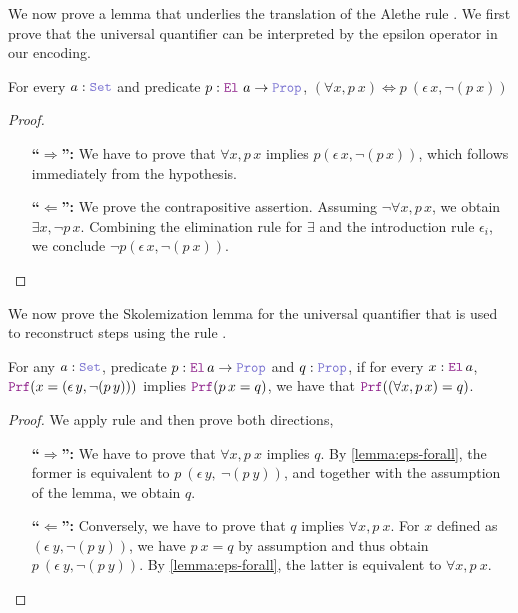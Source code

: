 We now prove a lemma that underlies the translation of the Alethe rule .
We first prove that the universal quantifier can be interpreted by the epsilon operator in our encoding.

\smallskip

\begin{lemma}\label{lemma:eps-forall}
For every $a : \set$ and predicate $p: \el~a \ra \prop$, $(\forall x, p~x) \Leftrightarrow p~(\epsilon\,x, \neg (p~x))$
\end{lemma}
\begin{proof}
\begin{itemize}
\item[\textbf{``$\Rightarrow$'':}]  We have to prove that $\forall x, p\,x$ implies $p(\epsilon\,x, \neg (p\,x))$, which follows immediately from the hypothesis.
\item[\textbf{``$\Leftarrow$'':}]  We prove the contrapositive assertion. Assuming $\neg \forall x, p\,x$, we obtain $\exists x, \neg p\,x$. Combining the elimination rule for $\exists$ and the introduction rule $\epsilon_i$, we conclude $\neg p(\epsilon\,x, \neg (p~x))$.
\end{itemize}
\end{proof}

We now prove the Skolemization lemma for the universal quantifier that is used to reconstruct steps using the rule .

\smallskip

\begin{lemma}\label{lem:sko-forall}
For any $a : \set$, predicate $p : \el{}\,a \ra \prop$ and $q : \prop$, if for every $x: \el{}\,a$, $\prf (x = (\epsilon \, y, \neg (p\,y)))$ implies $\prf (p\,x = q)$,  we have that $\prf ((\forall x, p\,x) = q)$.
\end{lemma}
\begin{proof} We apply rule  and then prove both directions,
\begin{itemize}
\item[\textbf{``$\Rightarrow$'':}]  We have to prove that $\forall x, p~x$ implies $q$. By \cref{lemma:eps-forall}, the former is equivalent to $p~(\epsilon\,y,~\neg (p~y))$, and together with the assumption of the lemma, we obtain $q$.
\item[\textbf{``$\Leftarrow$'':}]  Conversely, we have to prove that $q$ implies $\forall x, p~x$. For $x$ defined as $(\epsilon~y, \neg (p~y))$, we have $p~x = q$ by assumption and thus obtain $p~(\epsilon~y, \neg (p~y))$. By \cref{lemma:eps-forall}, the latter is equivalent to $\forall x, p~x$.
\end{itemize}
\end{proof}

